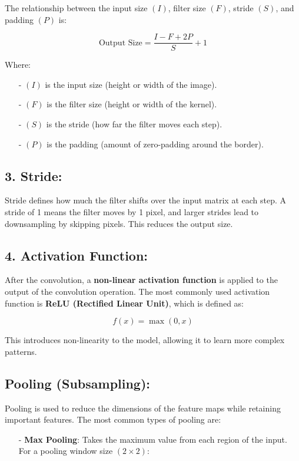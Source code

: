 \documentclass[10pt]{article}
\begin{document}
The relationship between the input size $( I )$, filter size $( F )$, stride $( S )$, and padding $( P )$ is:

$$
\text{Output Size} = \frac{I - F + 2P}{S} + 1
$$

Where:

\begin{itemize}
   \item [-] $( I )$ is the input size (height or width of the image).
   \item [-] $( F )$ is the filter size (height or width of the kernel).
   \item [-] $( S )$ is the stride (how far the filter moves each step).
   \item [-] $( P )$ is the padding (amount of zero-padding around the border).
\end{itemize}

\subsection{ 3. {\bf Stride}:}
Stride defines how much the filter shifts over the input matrix at each step. A stride of 1 means the filter moves by 1 pixel, and larger strides lead to downsampling by skipping pixels. This reduces the output size.

\subsection{ 4. {\bf Activation Function}:}
After the convolution, a {\bf non-linear activation function} is applied 
to the output of the convolution operation. 
The most commonly used activation function is 
{\bf ReLU (Rectified Linear Unit)}, which is 
defined as:

$$
f(x) = \max(0, x)
$$

This introduces non-linearity to the model, allowing it to learn more complex patterns.

\subsection{{\bf Pooling (Subsampling)}:}
Pooling is used to reduce the dimensions of the feature maps while retaining important features. The most common types of pooling are:

\begin{itemize}
   \item [-] {\bf Max Pooling}: Takes the maximum value from each region of the input. For a pooling window size $( 2 \times 2 )$:
\end{itemize}
\end{document}

